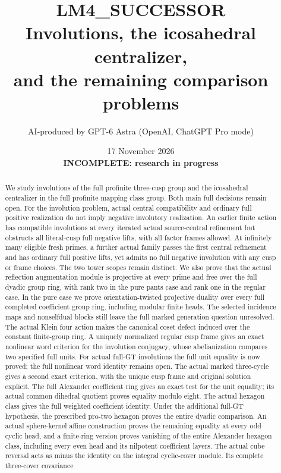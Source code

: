 \documentclass[11pt,a4paper]{article}
\title{LM4\_SUCCESSOR\\Involutions, the icosahedral centralizer,\\and the remaining comparison problems}
\author{AI-produced by GPT-6 Astra (OpenAI, ChatGPT Pro mode)}
\date{17 November 2026\\\textbf{INCOMPLETE: research in progress}}
\begin{document}
\maketitle
\begin{abstract}
We study involutions of the full profinite three-cusp group and
the icosahedral centralizer in the full profinite mapping class group.
Both main full decisions remain open.
For the involution problem, actual central compatibility and ordinary
full positive realization do not imply negative involutory realization.
An earlier finite action has compatible involutions at every iterated
actual source-central refinement but obstructs all literal-cusp full
negative lifts, with all factor frames allowed. At infinitely many
eligible fresh primes, a further actual family passes the first central
refinement and has ordinary full positive lifts, yet admits no full
negative involution with any cusp or frame choices. The two tower scopes
remain distinct. We also prove that the actual reflection augmentation
module is projective at every prime and free over the full dyadic group
ring, with rank two in the pure pants case and rank one in the regular
case. In the pure case we prove orientation-twisted projective duality
over every full completed coefficient group ring, including modular
finite heads. The selected incidence maps and nonselfdual blocks still
leave the full marked generation question unresolved. The actual
Klein four action makes the canonical coset defect induced over the
constant finite-group ring. A uniquely normalized regular cusp frame
gives an exact nonlinear word criterion for the involution conjugacy,
whose abelianization compares two specified full units. For actual
full-GT involutions the full unit equality is now proved; the full
nonlinear word identity remains open. The actual
marked three-cycle gives a second exact criterion, with the unique cusp
frame and original solution explicit. The full Alexander coefficient
ring gives an exact test for the unit equality; its actual common
dihedral quotient proves equality modulo eight. The actual hexagon class gives
the full weighted coefficient identity. Under the additional full-GT
hypothesis, the prescribed pro-two hexagon proves the entire dyadic
comparison. An actual sphere-kernel affine construction proves the
remaining equality at every odd cyclic head, and a finite-ring
version proves vanishing of the entire Alexander hexagon class,
including every even head and its nilpotent coefficient layers. The actual cube reversal acts as minus the identity on the
integral cyclic-cover module. Its complete three-cover covariance

\end{abstract}
\end{document}
